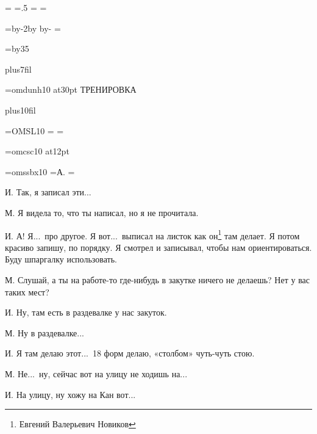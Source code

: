 \pdfpagewidth=297mm
\pdfpageheight=210mm
\pdfhorigin=1in
\pdfvorigin=0pt

\shhtotal=\pdfpagewidth
\htotal=.5\shhtotal
\vtotal=\pdfpageheight
\shoutline=0pt
\shstaplewidth=0pt
\shcrop=0pt
\shfootline={}
\shthickness=0pt %

\horigin=9mm
\hoffset=-9mm
\hsize=\htotal \advance\hsize by-2\horigin \advance\hsize by\hoffset
\advance\horigin by-\hoffset
\output={\ifodd\pageno\hoffset=0pt\fi \plainoutput}

\vorigin=15mm
\vsize=\topskip \advance\vsize by35\baselineskip

\nopagenumbers
\topglue 0pt plus7fil
\centerline{\font\F=omdunh10 at30pt \F ТРЕНИРОВКА}
\vskip 0pt plus10fil
\eject
\shipout\vbox{}

\font\TENSL=OMSL10
\headline={\line{\hrulefill}}
\footline={\line{\hss\tenrm\folio\hss}}

\font\csc=omcsc10 at12pt

\font\speakerF=omssbx10
\def\I{\item{\speakerF И.}}
\def\M{\item{\speakerF М.}}
=\hbox{\speakerF А.\enskip}
\parindent=


\I
Так, я записал эти...

\M
Я видела то, что ты написал, но я не прочитала.

\I
А! Я...\ про другое. Я вот...\ выписал на листок как он\footnote*{Евгений Валерьевич Новиков} там делает.
Я потом красиво запишу, по порядку.
Я смотрел и записывал, чтобы нам ориентироваться.
Буду шпаргалку использовать.

\M
Слушай, а ты на работе-то где-нибудь в закутке ничего не делаешь?
Нет у вас таких мест?

\I
Ну, там есть в раздевалке у нас закуток.

\M
Ну в раздевалке...

\I
Я там делаю этот...\
18 форм делаю, «столбом» чуть-чуть стою.

\M
Не...\ ну, сейчас вот на улицу не ходишь на...

\I
На улицу, ну хожу на Кан вот...

